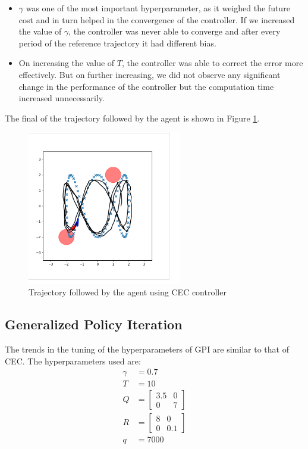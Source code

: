 \documentclass[conference]{IEEEtran}
\begin{document}
\begin{itemize}
    \item $\gamma$ was one of the most important hyperparameter, as it weighed the future cost and in turn helped in the convergence of the controller. If we increased the value of $\gamma$, the controller was never able to converge and after every period of the reference trajectory it had different bias.
    \item On increasing the value of $T$, the controller was able to correct the error more effectively. But on further increasing, we did not observe any significant change in the performance of the controller but the computation time increased unnecessarily.
\end{itemize}
The final of the trajectory followed by the agent is shown in Figure \ref{fig:cec}.
\begin{figure}
    \centering
    \includegraphics[width=0.6\textwidth]{CEC.png}
    \caption{Trajectory followed by the agent using CEC controller}
    \label{fig:cec}
\end{figure}
\subsection{Generalized Policy Iteration}
The trends in the tuning of the hyperparameters of GPI are similar to that of CEC. The hyperparameters used are:
\begin{align*}
    \gamma &= 0.7 \\
    T &= 10 \\
    Q &= \begin{bmatrix}
        3.5 & 0  \\
        0 & 7 
    \end{bmatrix} \\
    R &= \begin{bmatrix}
        8 & 0  \\
        0 & 0.1
    \end{bmatrix} \\
    q &= 7000
\end{align*}
\end{document}
